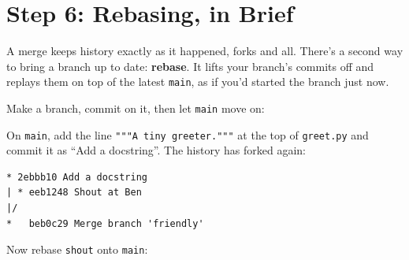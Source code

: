 \section{Step 6: Rebasing, in Brief}\label{10-lab-try-an-idea-without-breaking-anything:step-6-rebasing-in-brief}

A merge keeps history exactly as it happened, forks and all. There's a second way to bring a branch up to date: \textbf{rebase}. It lifts your branch's commits off and replays them on top of the latest \texttt{main}, as if you'd started the branch just now.


Make a branch, commit on it, then let \texttt{main} move on:

\begin{codeblock}

\begin{Shaded}
\begin{Highlighting}[]
  \OperatorTok{\textgreater{}\textgreater{}}
 
\end{Highlighting}
\end{Shaded}

\end{codeblock}


On \texttt{main}, add the line \texttt{"""A\ tiny\ greeter."""} at the top of \texttt{greet.py} and commit it as ``Add a docstring''. The history has forked again:

\begin{codeblock}
\begin{Verbatim}[formatcom=\outputstyle]
* 2ebbb10 Add a docstring
| * eeb1248 Shout at Ben
|/  
*   beb0c29 Merge branch 'friendly'
\end{Verbatim}
\end{codeblock}


Now rebase \texttt{shout} onto \texttt{main}:

\begin{codeblock}

\begin{Shaded}
\begin{Highlighting}[]
   
\end{Highlighting}
\end{Shaded}

\end{codeblock}

